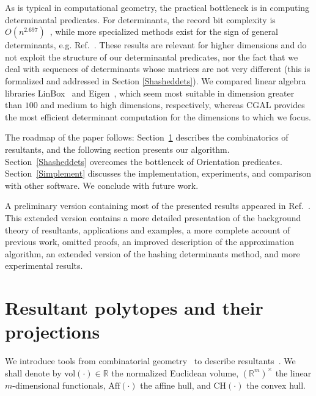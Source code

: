 \documentclass{article}
\newcommand\refcite[1]{\citealp{#1}} \newcommand\citess[1]{\textsuperscript{\textup{\citealp{#1}}}}
\def\RR{{\mathbb R}} \def\ZZ{{\mathbb Z}}
\newcommand{\Aff}{\mbox{Aff}}
\newcommand{\CH}{\mbox{CH}}
\begin{document}
As is typical in computational geometry, the practical bottleneck
is in computing determinantal predicates.
For determinants, the record bit complexity is
\(O(n^{2.697})\)~\citess{KaVi05},
while more specialized methods exist for the sign of general determinants,
e.g. Ref.~\refcite{BEPP99}.
These results are relevant for higher dimensions and do not exploit the
structure of our determinantal predicates, nor the fact that we deal
with sequences of determinants whose matrices are not very different
(this is formalized and addressed in Section \ref{Shasheddets}).
We compared linear algebra libraries LinBox~\citess{DGGGHKSTV} and
Eigen~\citess{eigenweb}, which seem most suitable in dimension greater than $100$ and
medium to high dimensions, respectively, whereas CGAL provides the most
efficient determinant computation for the dimensions to which we focus.

The roadmap of the paper follows:
Section~\ref{Scombinatorics} describes the combinatorics of resultants, and
the following section presents our algorithm.
Section~\ref{Shasheddets} overcomes the bottleneck of Orientation predicates.
Section~\ref{Simplement} discusses the implementation, experiments, and 
comparison with other software.
We conclude with future work.  

A preliminary version containing most of the presented results 
appeared in Ref.~\refcite{EFKP12}. This extended version contains a more
detailed presentation of the background theory of resultants, applications
and examples, a more complete account of previous work, omitted proofs, 
an improved description of the approximation
algorithm, an extended version of the
hashing determinants method, and more experimental results.  

\section{Resultant polytopes and their projections}\label{Scombinatorics}

We introduce tools from combinatorial geometry~\citess{DeLRamSan,Ziegler}
to describe resultants~\citess{GKZ,CLO2}. 
We shall denote by vol$(\cdot)\in\RR$  the normalized Euclidean volume,
$(\RR^m)^{\times}$ the linear $m$-dimensional functionals, $\Aff(\cdot)$ the affine hull, and 
$\CH(\cdot)$ the convex hull. 
\end{document}
